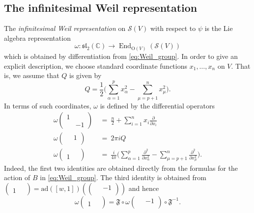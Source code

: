 \documentclass[reqno, 11pt]{amsart} %
\numberwithin{equation}{section}
\theoremstyle{plain}
\theoremstyle{definition}
\theoremstyle{remark}
\newcommand{\mr}{\mathrm}
\newcommand{\lr}{\longrightarrow}
\newcommand{\mbC}{\mathbb{C}}
\newcommand{\mcS}{\mathcal{S}}
\newcommand{\mfF}{\mathfrak{F}}
\newcommand{\mfl}{\mathfrak{l}}
\newcommand{\mfs}{\mathfrak{s}}
\newcommand{\mfsl}{\mfs\mfl}
\DeclareMathOperator{\End}{End}
\begin{document}
\subsection{The infinitesimal Weil representation}
\label{ss:infinitesimal_Weil_rep}

The \emph{infinitesimal Weil representation} on $\mcS(V)$ with respect to $ψ$ is the Lie algebra representation
$$ω:\mfsl_2(\mbC) \lr \End_{\mr{O}(V)}(\mcS(V))$$
which is obtained by differentiation from \eqref{eq:Weil_group}. In order to give an explicit description, we choose standard coordinate functions $x_1,\ldots,x_n$ on $V$. That is, we assume that $Q$ is given by
$$Q = \frac{1}{2}\Big(\sum_{α = 1}^p x_α^2 - \sum_{μ = p+1}^n x_μ^2\Big).$$
In terms of such coordinates, $ω$ is defined by the differential operators
\begin{equation}\label{eq:Weil_Lie_algebra}
\begin{aligned}
ω\begin{pmatrix}
1 & \\ & -1
\end{pmatrix} &\ =\ \frac{n}{2} + \sum_{i = 1}^n x_i \frac{\partial}{\partial x_i} \\[1mm]
ω\begin{pmatrix}
& 1 \\ \ &
\end{pmatrix} &\ =\ 2πiQ\\[1mm]
ω\begin{pmatrix}
&\  \\ 1 &
\end{pmatrix} &\ =\ \frac{i}{4π}\Big(\sum_{α = 1}^p \frac{\partial^2}{\partial x_α^2} - \sum_{μ = p+1}^n \frac{\partial^2}{\partial x_μ^2}\Big).
\end{aligned}
\end{equation}
Indeed, the first two identities are obtained directly from the formulas for the action of $B$ in \eqref{eq:Weil_group}. The third identity is obtained from $\left(\begin{smallmatrix} &\ \\1 &\end{smallmatrix}\right) = \mr{ad}([w,1])\left(\left(\begin{smallmatrix} \ & -1 \\ &\end{smallmatrix}\right)\right)$ and hence
$$ω\left(\begin{smallmatrix} &\ \\1 &\end{smallmatrix}\right) = \mfF \circ ω\left(\begin{smallmatrix} \ & -1 \\ &\end{smallmatrix}\right)\circ \mfF^{-1}.$$
\end{document}
